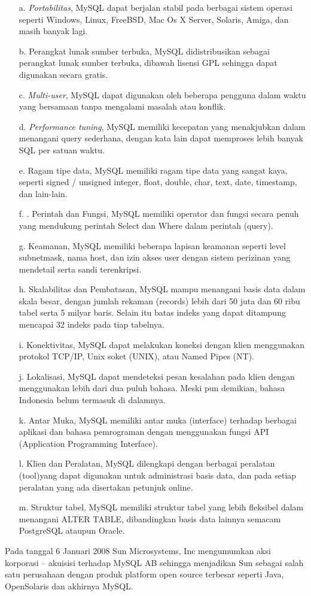 \documentclass{jtetiproposalskripsi}
\begin{document}
\begin{itemize}
\item[a.]\textit{Portabilitas}, MySQL dapat berjalan stabil pada berbagai sistem operasi seperti Windows, Linux, FreeBSD, Mac Os X Server, Solaris, Amiga, dan masih banyak lagi.
\item[b.]Perangkat   lunak   sumber   terbuka,      MySQL   didistribusikan   sebagai perangkat lunak sumber terbuka, dibawah lisensi GPL sehingga dapat digunakan secara gratis.
\item[c.]\textit{Multi-user},  MySQL  dapat  digunakan  oleh  beberapa  pengguna  dalam waktu yang bersamaan tanpa mengalami masalah atau konflik.
\item[d.]\textit{Performance  tuning},  MySQL  memiliki  kecepatan  yang  menakjubkan dalam  menangani  query sederhana,  dengan  kata lain  dapat  memproses lebih banyak SQL per satuan waktu.
\item[e.]Ragam tipe data, MySQL memiliki ragam tipe data yang sangat kaya, seperti signed / unsigned integer, float, double, char, text, date, timestamp, dan lain-lain.
\item[f.].  Perintah dan Fungsi, MySQL memiliki operator dan fungsi secara penuh yang mendukung perintah Select dan Where dalam perintah (query).
\item[g.]Keamanan,  MySQL  memiliki  beberapa  lapisan  keamanan  seperti  level subnetmask, nama host, dan izin akses user dengan sistem perizinan yang mendetail serta sandi terenkripsi.
\item[h.]Skalabilitas dan Pembatasan, MySQL mampu menangani basis data dalam skala besar, dengan jumlah rekaman (records) lebih dari 50 juta dan 60 ribu  tabel  serta  5  milyar  baris.  Selain  itu  batas  indeks  yang  dapat ditampung mencapai 32 indeks pada tiap tabelnya.
\item[i.]Konektivitas,   MySQL   dapat   melakukan   koneksi   dengan   klien menggunakan protokol TCP/IP, Unix soket (UNIX), atau Named Pipes (NT).
\item[j.]Lokalisasi, MySQL dapat mendeteksi pesan kesalahan pada klien dengan menggunakan lebih dari dua puluh bahasa. Meski pun demikian, bahasa Indonesia belum termasuk di dalamnya.
\item[k.]Antar Muka, MySQL memiliki antar muka (interface) terhadap berbagai aplikasi dan bahasa pemrograman dengan menggunakan fungsi API (Application Programming Interface). 
\item[l.]Klien dan Peralatan, MySQL dilengkapi dengan berbagai peralatan (tool)yang dapat digunakan untuk administrasi basis data, dan pada setiap peralatan yang ada disertakan petunjuk online.
\item[m.]Struktur tabel, MySQL memiliki struktur tabel yang lebih fleksibel dalam menangani ALTER TABLE, dibandingkan basis data lainnya semacam PostgreSQL ataupun Oracle.
\end{itemize}
Pada tanggal  6  Januari  2008  Sun  Microsystems,  Inc mengumumkan  aksi korporasi – akuisisi terhadap MySQL AB sehingga menjadikan Sun sebagai salah satu perusahaan dengan produk platform open source terbesar seperti Java, OpenSolaris dan akhirnya MySQL.
\end{document}
